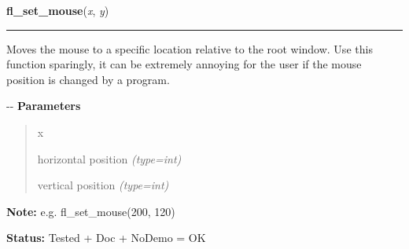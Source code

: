 \hspace{.8\funcindent}\begin{boxedminipage}{\funcwidth}

    \raggedright \textbf{fl\_set\_mouse}(\textit{x}, \textit{y})

    \vspace{-1.5ex}

    \rule{\textwidth}{0.5\fboxrule}
\setlength{\parskip}{2ex}

Moves the mouse to a specific location relative to the root window.
Use this function sparingly, it can be extremely annoying for the user
if the mouse position is changed by a program.

-{}-
\setlength{\parskip}{1ex}
      \textbf{Parameters}
      \vspace{-1ex}

      \begin{quote}
        \begin{Ventry}{x}

          \item[x]


horizontal position
            {\it (type=int)}

          \item[y]


vertical position
            {\it (type=int)}

        \end{Ventry}

      \end{quote}

\textbf{Note:} 
e.g. fl\_set\_mouse(200, 120)


\textbf{Status:} 
Tested + Doc + NoDemo = OK


    \end{boxedminipage}

    \label{xformslib:flxbasic:fl_get_win_mouse}

    \vspace{0.5ex}

